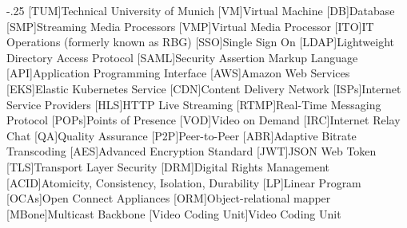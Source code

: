 \documentclass[headsepline,footsepline,footinclude=false,oneside,fontsize=11pt,paper=a4,listof=totoc,bibliography=totoc]{scrbook} %
\begin{document}


\frontmatter{}





\tableofcontents{}

\mainmatter{}






%





\appendix{}


\begin{acronym}
	\itemsep-.25\baselineskip
	[TUM]{Technical University of Munich}
 	[VM]{Virtual Machine}
 	[DB]{Database}
 	[SMP]{Streaming Media Processors}
 	[VMP]{Virtual Media Processor}
 	[ITO]{IT Operations (formerly known as RBG)}
 	[SSO]{Single Sign On}
 	[LDAP]{Lightweight Directory Access Protocol}
 	[SAML]{Security Assertion Markup Language}
 	[API]{Application Programming Interface}
 	[AWS]{Amazon Web Services}
 	[EKS]{Elastic Kubernetes Service}
 	[CDN]{Content Delivery Network}
 	[ISPs]{Internet Service Providers}
 	[HLS]{HTTP Live Streaming}
 	[RTMP]{Real-Time Messaging Protocol}
 	[POPs]{Points of Presence}
 	[VOD]{Video on Demand}
 	[IRC]{Internet Relay Chat}
 	[QA]{Quality Assurance}
 	[P2P]{Peer-to-Peer}
 	[ABR]{Adaptive Bitrate Transcoding}
 	[AES]{Advanced Encryption Standard}
 	[JWT]{JSON Web Token}
 	[TLS]{Transport Layer Security}
 	[DRM]{Digital Rights Management}
 	[ACID]{Atomicity, Consistency, Isolation, Durability}
 	[LP]{Linear Program}
 	[OCAs]{Open Connect Appliances}
    [ORM]{Object-relational mapper}
 	[MBone]{Multicast Backbone}
    [Video Coding Unit]{Video Coding Unit}
\end{acronym}

\listoffigures{}
\listoftables{}
\printbibliography{}
\end{document}
